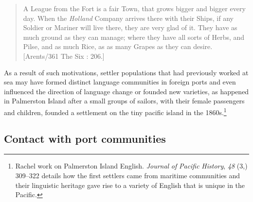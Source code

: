 \begin{quotation}
A League from the Fort is a fair Town, that grows bigger and bigger every day. When the \textit{Holland} Company arrives there with their Ships, if any Soldier or Mariner will live there, they are very glad of it. They have as much ground as they can manage; where they have all sorts of Herbs, and Pilse, and as much Rice, as as many Grapes as they can desire. [Arents/361 The Six \citealt{Voyages1678}: 206.]\end{quotation}

As a result of such motivations, settler populations that had previously worked at sea may have formed distinct language communities in foreign ports and even influenced the direction of language change or founded new varieties, as happened in Palmerston Island after a small groups of sailors, with their female passengers and children, founded a settlement on the tiny pacific island in the 1860s.\footnote{Rachel  work on Palmerston Island English. \textit{Journal} \textit{of} \textit{Pacific} \textit{History}, \textit{48} (3,) 309–322 details how the first settlers came from maritime communities and their linguistic heritage gave rise to a variety of English that is unique in the Pacific.} 

\subsection{\textbf{Contact} \textbf{with} \textbf{port} \textbf{communities}}%


